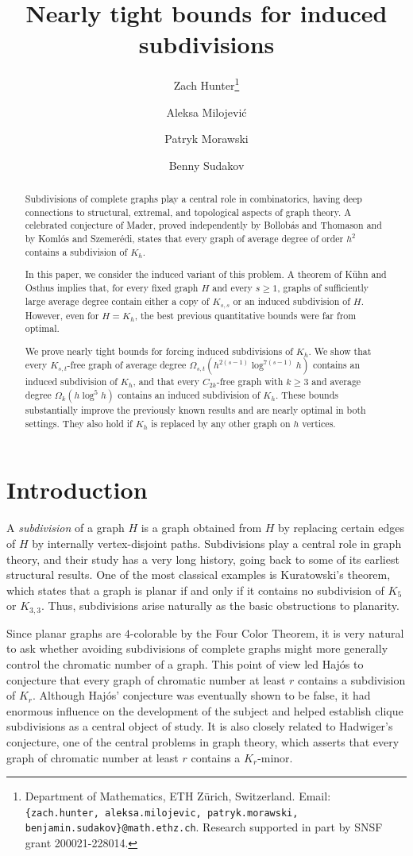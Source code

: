 \documentclass[10pt, a4paper]{article}
\title{\vspace{-0.9cm} Nearly tight bounds for induced subdivisions}
\author{
Zach Hunter\thanks{Department of Mathematics, ETH Z\"urich, Switzerland. Email: {\tt \{zach.hunter, aleksa.milojevic, patryk.morawski, benjamin.sudakov\}@math.ethz.ch}. Research supported in part by SNSF grant 200021-228014.}
\and Aleksa Milojevi\'c\footnotemark[1] 
\and 
Patryk Morawski\footnotemark[1]
\and Benny Sudakov\footnotemark[1]}
\date{}
\numberwithin{theorem}{section} %
\theoremstyle{remark}
\theoremstyle{definition}
\begin{document}
\maketitle
\begin{abstract}
Subdivisions of complete graphs play a central role in combinatorics, having deep connections to structural, extremal, and topological aspects of graph theory. A celebrated conjecture of Mader, proved independently by Bollob\'as and Thomason and by Koml\'os and Szemer\'edi, states that every graph of average degree of order $h^2$ contains a subdivision of $K_h$. 

In this paper, we consider the induced variant of this problem. A theorem of K\"uhn and Osthus implies that, for every fixed graph $H$ and every $s\ge 1$, graphs of sufficiently large average degree contain either a copy of $K_{s,s}$ or an induced subdivision of $H$. However, even for $H=K_h$, the best previous quantitative bounds were far from optimal.

We prove nearly tight bounds for forcing induced subdivisions of $K_h$. We show that every $K_{s,t}$-free graph of average degree $\Omega_{s,t}(h^{2(s-1)}\log^{7(s-1)} h)$ contains an induced subdivision of $K_h$, and that every $C_{2k}$-free graph with $k \geq 3$ and average degree $\Omega_k(h\log^5 h)$ contains an induced subdivision of $K_h$. These bounds substantially improve the previously known results and are nearly optimal in both settings. They
also hold if $K_h$ is replaced by any other graph on $h$ vertices.
\end{abstract}

\section{Introduction}
A \emph{subdivision} of a graph $H$ is a graph obtained from $H$ by replacing certain edges of $H$ by internally vertex-disjoint paths. Subdivisions play a central role in graph theory, and their study has a very long history, going back to some of its earliest structural results. One of the most classical examples is Kuratowski's theorem, which states that a graph is planar if and only if it contains no subdivision of $K_5$ or $K_{3,3}$. Thus, subdivisions arise naturally as the basic obstructions to planarity. 

Since planar graphs are $4$-colorable by the Four Color Theorem, it is very natural to ask whether avoiding subdivisions of complete graphs might more generally control the chromatic number of a graph. This point of view led Haj\'os to conjecture that every graph of chromatic number at least $r$ contains a subdivision of $K_r$. Although Haj\'os' conjecture was eventually shown to be false, it had enormous influence on the development of the subject and helped establish clique subdivisions as a central object of study. It is also closely related to Hadwiger's conjecture, one of the central problems in graph theory, which asserts that every graph of chromatic number at least $r$ contains a $K_r$-minor.
\end{document}

